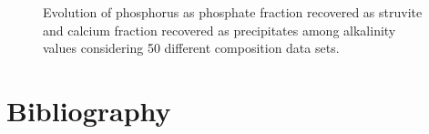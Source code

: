 \begin{refsection}[referencesCh3]
\begin{figure}[h]
	\caption{Evolution of phosphorus as phosphate fraction recovered as struvite and calcium fraction recovered as precipitates among alkalinity values considering 50 different composition data sets.}
	\label{fig:estimation_Alk}
\end{figure}

\clearpage

\section*{Bibliography}

\printbibliography[heading=none]
\end{refsection}


